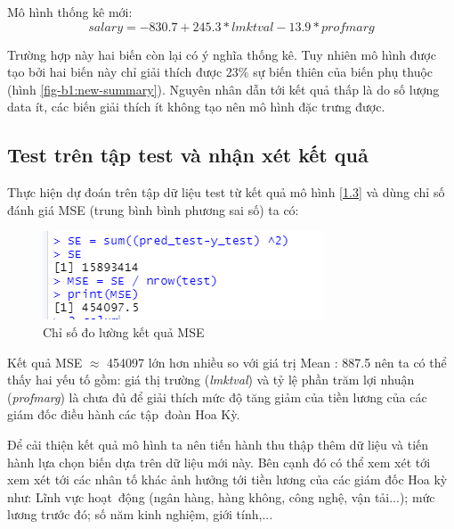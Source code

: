 Mô hình thống kê mới:
\begin{equation}\label{1.3}
\textit{salary} = -830.7 + 245.3 *\textit{lmktval} -13.9 *\textit{profmarg}
\end{equation}

Trường hợp này hai biến còn lại có ý nghĩa thống kê. Tuy nhiên mô hình được tạo bởi hai biến này chỉ giải thích được 23$\%$ sự biến thiên của biến phụ thuộc (hình \ref{fig-b1:new-summary}). Nguyên nhân dẫn tới kết quả thấp là do số lượng data ít, các biến giải thích ít không tạo nên mô hình đặc trưng được.

\subsection*{Test trên tập test và nhận xét kết quả}

Thực hiện dự đoán trên tập dữ liệu test từ kết quả mô hình \ref{1.3} và dùng chỉ số đánh giá MSE (trung bình bình phương sai số) ta có:

\begin{figure}[H]
	\centering
	\includegraphics[width=.5\linewidth]{../Photo Of Result/B1_MSE.PNG}  
	\caption{Chỉ số đo lường kết quả MSE}
	\label{fig-b1:mse}
\end{figure}

Kết quả MSE $\approx$ 454097 lớn hơn nhiều so với giá trị Mean : 887.5 nên ta có thể thấy hai yếu tố gồm: giá thị trường (\textit{lmktval}) và tỷ lệ phần trăm lợi nhuận (\textit{profmarg}) là chưa đủ để giải thích mức độ tăng giảm của tiền lương của các giám đốc điều hành các tập~đoàn Hoa Kỳ. 

Để cải thiện kết quả mô hình ta nên tiến hành thu thập thêm dữ liệu và tiến hành lựa chọn biến dựa trên dữ liệu mới này. Bên cạnh đó có thể xem xét tới xem xét tới các nhân tố khác ảnh hưởng tới tiền lương của các giám đốc Hoa kỳ như: Lĩnh vực hoạt~động (ngân hàng, hàng không, công nghệ, vận tải...); mức lương trước đó; số năm kinh nghiệm, giới tính,...
	

